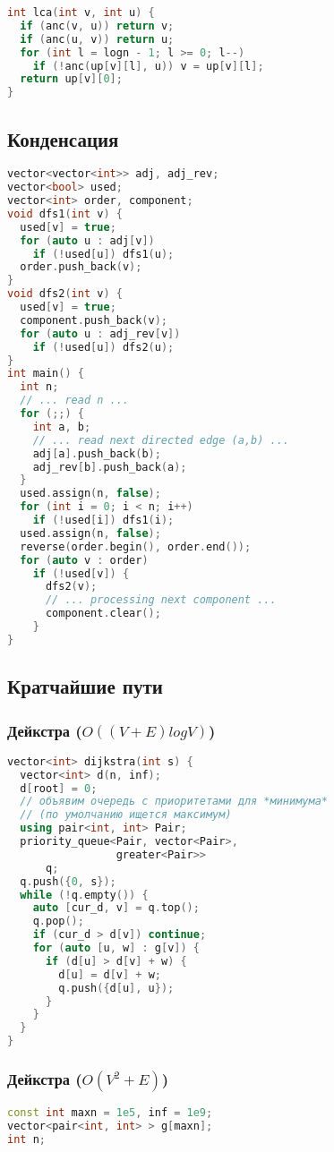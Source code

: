 \documentclass[10pt,a4paper,landscape,twosided]{extarticle}
\begin{document}
\begin{multicols}{3}
\begin{lstlisting}[language=C++]
int lca(int v, int u) {
  if (anc(v, u)) return v;
  if (anc(u, v)) return u;
  for (int l = logn - 1; l >= 0; l--)
    if (!anc(up[v][l], u)) v = up[v][l];
  return up[v][0];
}
\end{lstlisting}

\subsection{Конденсация}
\begin{lstlisting}[language=C++]
vector<vector<int>> adj, adj_rev;
vector<bool> used;
vector<int> order, component;
void dfs1(int v) {
  used[v] = true;
  for (auto u : adj[v])
    if (!used[u]) dfs1(u);
  order.push_back(v);
}
void dfs2(int v) {
  used[v] = true;
  component.push_back(v);
  for (auto u : adj_rev[v])
    if (!used[u]) dfs2(u);
}
int main() {
  int n;
  // ... read n ...
  for (;;) {
    int a, b;
    // ... read next directed edge (a,b) ...
    adj[a].push_back(b);
    adj_rev[b].push_back(a);
  }
  used.assign(n, false);
  for (int i = 0; i < n; i++)
    if (!used[i]) dfs1(i);
  used.assign(n, false);
  reverse(order.begin(), order.end());
  for (auto v : order)
    if (!used[v]) {
      dfs2(v);
      // ... processing next component ...
      component.clear();
    }
}
\end{lstlisting}

\subsection{Кратчайшие пути}

\subsubsection{Дейкстра ($O((V+E)logV)$)}
\begin{lstlisting}[language=C++]
vector<int> dijkstra(int s) {
  vector<int> d(n, inf);
  d[root] = 0;
  // объявим очередь с приоритетами для *минимума*
  // (по умолчанию ищется максимум)
  using pair<int, int> Pair;
  priority_queue<Pair, vector<Pair>,
                 greater<Pair>>
      q;
  q.push({0, s});
  while (!q.empty()) {
    auto [cur_d, v] = q.top();
    q.pop();
    if (cur_d > d[v]) continue;
    for (auto [u, w] : g[v]) {
      if (d[u] > d[v] + w) {
        d[u] = d[v] + w;
        q.push({d[u], u});
      }
    }
  }
}
\end{lstlisting}

\subsubsection{Дейкстра ($O(V^2+E)$)}
\begin{lstlisting}[language=C++]
const int maxn = 1e5, inf = 1e9;
vector<pair<int, int> > g[maxn];
int n;


\end{lstlisting}
\end{multicols}
\end{document}
